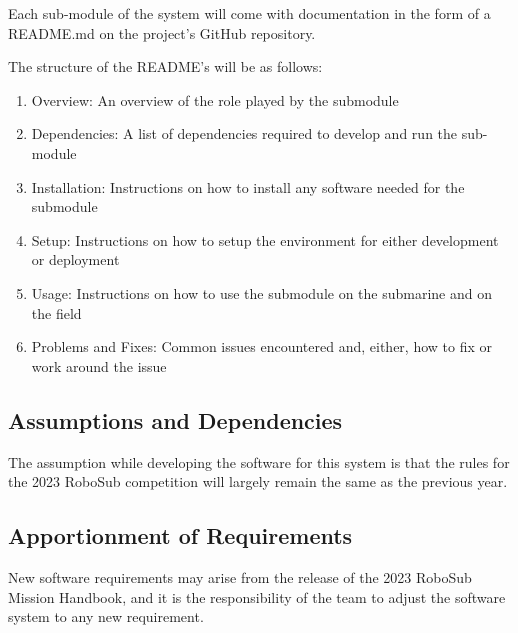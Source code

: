 Each sub-module of the system will come with documentation in the form of a
README.md on the project’s GitHub repository. 
\par

The structure of the README’s will be as follows: 

\begin{enumerate}
    \item Overview: An overview of the role played by the submodule 
    \item Dependencies: A list of dependencies required to develop and run the sub-module 
    \item Installation: Instructions on how to install any software needed for the submodule 
    \item Setup: Instructions on how to setup the environment for either development or deployment 
    \item Usage: Instructions on how to use the submodule on the submarine and on the field 
    \item Problems and Fixes: Common issues encountered and, either, how to fix or work around the issue 
\end{enumerate}

\subsection{Assumptions and Dependencies}
\label{sec:assumptions}

The assumption while developing the software for this system is that the rules
for the 2023 RoboSub competition will largely remain the same as the previous
year.

\subsection{Apportionment of Requirements}
\label{sec:apportionment}

New software requirements may arise from the release of the 2023 RoboSub
Mission Handbook, and it is the responsibility of the team to adjust the
software system to any new requirement.

